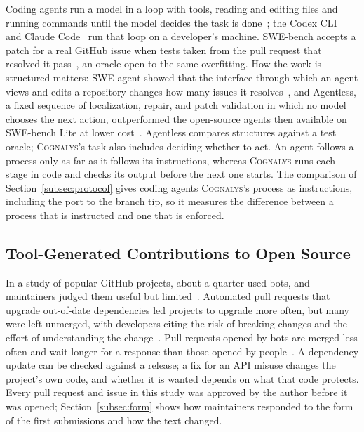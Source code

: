 \documentclass[conference]{IEEEtran}
\newcommand{\system}{\textsc{Cognalys}}
\begin{document}
Coding agents run a model in a loop with tools, reading and editing files and
running commands until the model decides the task is
done~\cite{yang2024sweagent}; the Codex CLI~\cite{openai2026codex} and Claude
Code~\cite{anthropic2026claudecode} run that loop on a developer's machine.
SWE-bench accepts a patch for a real GitHub issue when tests taken from the
pull request that resolved it pass~\cite{jimenez2024swebench}, an oracle open
to the same overfitting. How the work is structured matters: SWE-agent showed
that the interface through which an agent views and edits a repository changes
how many issues it resolves~\cite{yang2024sweagent}, and Agentless, a fixed
sequence of localization, repair, and patch validation in which no model
chooses the next action, outperformed the open-source agents then available on
SWE-bench Lite at lower cost~\cite{xia2025agentless}. Agentless compares
structures against a test oracle; \system{}'s task also includes deciding
whether to act. An agent follows a process only as far as it follows its
instructions, whereas \system{} runs each stage in code and checks its output
before the next one starts. The comparison of Section~\ref{subsec:protocol}
gives coding agents \system{}'s process as instructions, including the port to
the branch tip, so it measures the difference between a process that is
instructed and one that is enforced.

\subsection{Tool-Generated Contributions to Open Source}
\label{subsec:bots}

In a study of popular GitHub projects, about a quarter used bots, and
maintainers judged them useful but limited~\cite{wessel2018bots}. Automated
pull requests that upgrade out-of-date dependencies led projects to upgrade
more often, but many were left unmerged, with developers citing the risk of
breaking changes and the effort of understanding the
change~\cite{mirhosseini2017autopr}. Pull requests opened by bots are merged
less often and wait longer for a response than those opened by
people~\cite{wyrich2021botprs}. A dependency update can be checked against a
release; a fix for an API misuse changes the project's own code, and whether it
is wanted depends on what that code protects. Every pull request and issue in
this study was approved by the author before it was opened;
Section~\ref{subsec:form} shows how maintainers responded to the form of the
first submissions and how the text changed.
\end{document}
